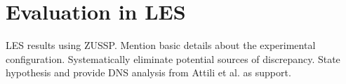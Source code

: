 \section{Evaluation in LES}
\label{sec:subfilter:leszussp}

LES results using ZUSSP. Mention basic details about the experimental configuration. Systematically eliminate potential sources of discrepancy. State hypothesis and provide DNS analysis from Attili et al. as support.
